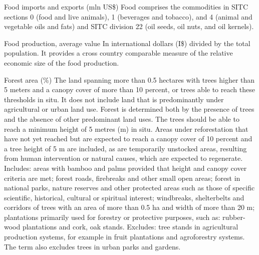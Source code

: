 \begin{MetadataCollection} {}
\begin{Energy consumption in agriculture, total} {}
\begin{metadata}{Food imports and exports (mln US\$)} {}
Food comprises the commodities in SITC sections 0 (food and live animals), 1 (beverages and tobacco), and 4 (animal and vegetable oils and fats) and SITC division 22 (oil seeds, oil nuts, and oil kernels).
\end{metadata}

\begin{metadata}{Food production, average value} {}
 In international dollars (I\$) divided by the total population. It provides a cross country comparable measure of the relative economic size of the food production.
\end{metadata}

\begin{metadata}{Forest area (\%)} {}
The land spanning more than 0.5 hectares with trees higher than 5 meters and a canopy cover of more than 10 percent, or trees able to reach these thresholds in situ. It does not include land that is predominantly under agricultural or urban land use. Forest is determined both by the presence of trees and the absence of other predominant land uses. The trees should be able to reach a minimum height of 5 metres (m) in situ. Areas under reforestation that have not yet reached but are expected to reach a canopy cover of 10 percent and a tree height of 5 m are included, as are temporarily unstocked areas, resulting from human intervention or natural causes, which are expected to regenerate. Includes: areas with bamboo and palms provided that height and canopy cover criteria are met; forest roads, firebreaks and other small open areas; forest in national parks, nature reserves and other protected areas such as those of specific scientific, historical, cultural or spiritual interest; windbreaks, shelterbelts and corridors of trees with an area of more than 0.5 ha and width of more than 20 m; plantations primarily used for forestry or protective purposes, such as: rubber-wood plantations and cork, oak stands. Excludes: tree stands in agricultural production systems, for example in fruit plantations and agroforestry systems. The term also excludes trees in urban parks and gardens.
\end{metadata}


\end{Energy consumption in agriculture, total}
\end{MetadataCollection}

